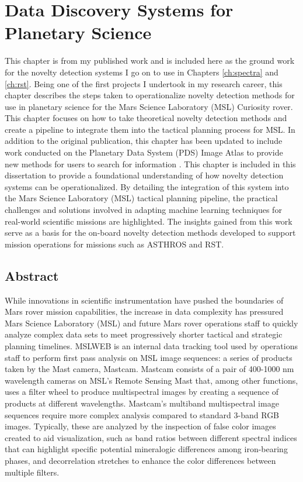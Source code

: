 \chapter[Data Discovery Systems for Planetary Science]{Data Discovery Systems for Planetary Science}
\label{ch:msl}
This chapter is from my published work \cite{horton2021integrating} and is included here as the ground work for the novelty detection systems I go on to use in Chapters \ref{ch:spectra} and \ref{ch:rst}.
Being one of the first projects I undertook in my research career, this chapter describes the steps taken to operationalize novelty detection methods for use in planetary science for the Mars Science Laboratory (MSL) Curiosity rover.
This chapter focuses on how to take theoretical novelty detection methods and create a pipeline to integrate them into the tactical planning process for MSL.
In addition to the original publication, this chapter has been updated to include work conducted on the Planetary Data System (PDS) Image Atlas to provide new methods for users to search for information \cite{horton2020novelty}.
This chapter is included in this dissertation to provide a foundational understanding of how novelty detection systems can be operationalized.
By detailing the integration of this system into the Mars Science Laboratory (MSL) tactical planning pipeline, the practical challenges and solutions involved in adapting machine learning techniques for real-world scientific missions are highlighted.
The insights gained from this work serve as a basis for the on-board novelty detection methods developed to support mission operations for missions such as ASTHROS and RST. 

\section{Abstract}
While innovations in scientific instrumentation have pushed the boundaries of Mars rover mission capabilities, the increase in data complexity has pressured Mars Science Laboratory (MSL) and future Mars rover operations staff to quickly analyze complex data sets to meet progressively shorter tactical and strategic planning timelines. 
MSLWEB is an internal data tracking tool used by operations staff to perform first pass analysis on MSL image sequences: a series of products taken by the Mast camera, Mastcam. Mastcam consists of a pair of 400-1000 nm wavelength cameras on MSL's Remote Sensing Mast that, among other functions, uses a filter wheel to produce multispectral images by creating a sequence of products at different wavelengths. 
Mastcam's multiband multispectral image sequences require more complex analysis compared to standard 3-band RGB images. 
Typically, these are analyzed by the inspection of false color images created to aid visualization, such as band ratios between different spectral indices that can highlight specific potential mineralogic differences among iron-bearing phases, and decorrelation stretches to enhance the color differences between multiple filters. 

